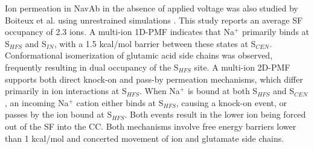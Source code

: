 \begin{refsection}
Ion permeation in NavAb in the absence of applied voltage was also studied by Boiteux et al. using unrestrained simulations \cite{Boiteux:2014ut}.  This study reports an average SF occupancy of 2.3 ions.  A multi-ion 1D-PMF indicates that Na$^{+}$ primarily binds at S$_{HFS}$ and S$_{IN}$, with a 1.5 kcal/mol barrier between these states at S$_{CEN}$.  Conformational isomerization of glutamic acid side chains was observed, frequently resulting in dual occupancy of the S$_{HFS}$ site.  A multi-ion 2D-PMF supports both direct knock-on and pass-by permeation mechanisms, which differ primarily in ion interactions at S$_{HFS}$.  When Na$^{+}$ is bound at both S$_{HFS}$ and S$_{CEN}$, an incoming Na$^{+}$ cation either binds at S$_{HFS}$, causing a knock-on event, or passes by the ion bound at S$_{HFS}$.  Both events result in the lower ion being forced out of the SF into the CC.  Both mechanisms involve free energy barriers lower than 1 kcal/mol and concerted movement of ion and glutamate side chains. 
 

\end{refsection}
